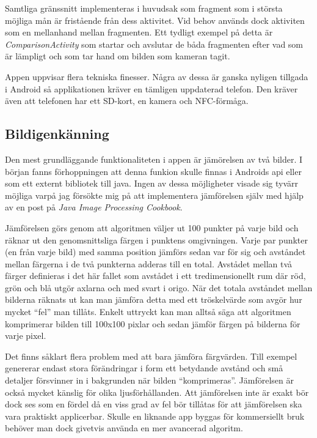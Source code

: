 \documentclass[11px, a4paper]{article}
\begin{document}
	Samtliga gränssnitt implementeras i huvudsak som fragment som i största möjliga mån är fristående från dess aktivitet. Vid behov används dock aktiviten som en mellanhand mellan fragmenten\cite{FragmentCommunication}. Ett tydligt exempel på detta är \emph{ComparisonActivity} som startar och avslutar de båda fragmenten efter vad som är lämpligt och som tar hand om bilden som kameran tagit.

	Appen uppvisar flera tekniska finesser. Några av dessa är ganska nyligen tillgada i Android så applikationen kräver en tämligen uppdaterad telefon. Den kräver även att telefonen har ett SD-kort, en kamera och NFC-förmåga.

\subsection{Bildigenkänning}
\label{subsec:image_recog}
	Den mest grundläggande funktionaliteten i appen är jämörelsen av två bilder. I början fanns förhoppningen att denna funkion skulle finnas i Androids api eller som ett externt bibliotek till java. Ingen av dessa möjligheter visade sig tyvärr möjliga varpå jag försökte mig på att implementera jämförelsen själv med hjälp av en post på \emph{Java Image Processing Cookbook}\cite{ImageComparison}.

	Jämförelsen görs genom att algoritmen väljer ut 100 punkter på varje bild och räknar ut den genomsnittsliga färgen i punktens omgivningen. Varje par punkter (en från varje bild) med samma position jämförs sedan var för sig och avståndet mellan färgerna i de två punkterna adderas till en total. Avstådet mellan två färger definieras i det här fallet som avstådet i ett tredimensionellt rum där röd, grön och blå utgör axlarna och med svart i origo. När det totala avståndet mellan bilderna räknats ut kan man jämföra detta med ett tröskelvärde som avgör hur mycket ``fel'' man tillåts. Enkelt uttryckt kan man alltså säga att algoritmen komprimerar bilden till 100x100 pixlar och sedan jämför färgen på bilderna för varje pixel.

	Det finns såklart flera problem med att bara jämföra färgvärden. Till exempel genererar endast stora förändringar i form ett betydande avstånd och små detaljer försvinner in i bakgrunden när bilden ``komprimeras''. Jämförelsen är också mycket känslig för olika ljusförhållanden. Att jämförelsen inte är exakt bör dock ses som en fördel då en viss grad av fel bör tillåtas för att jämförelsen ska vara praktiskt applicerbar. Skulle en liknande app byggas för kommersiellt bruk behöver man dock givetvis använda en mer avancerad algoritm.
\end{document}
